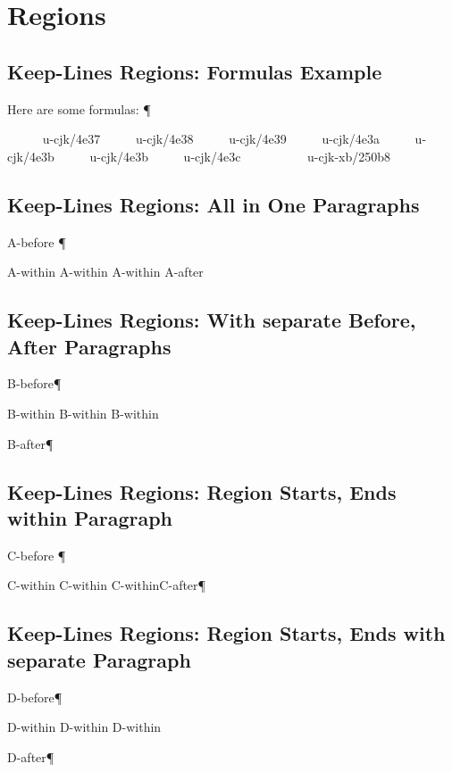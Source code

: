 

\chapter{Regions
}

\section{Keep-Lines Regions: Formulas Example
}


Here are some formulas:
¶\par\begingroup{}     
{\mktsFontfileSourcecodeproregular{}u-cjk/4e37}     
{\mktsFontfileSourcecodeproregular{}u-cjk/4e38}     
{\mktsFontfileSourcecodeproregular{}u-cjk/4e39}     
{\mktsFontfileSourcecodeproregular{}u-cjk/4e3a}     
{\mktsFontfileSourcecodeproregular{}u-cjk/4e3b}     
{\mktsFontfileSourcecodeproregular{}u-cjk/4e3b}     
{\mktsFontfileSourcecodeproregular{}u-cjk/4e3c}          
{\mktsFontfileSourcecodeproregular{}u-cjk-xb/250b8}     \endgroup{}
\section{Keep-Lines Regions: All in One Paragraphs
}


A-before
¶\par\begingroup\obeyalllines{}A-within
A-within
A-within
\endgroup{}A-after
\section{Keep-Lines Regions: With separate Before, After Paragraphs
}


B-before¶\par

\begingroup\obeyalllines{}B-within
B-within
B-within
\endgroup{}

B-after¶\par
\section{Keep-Lines Regions: Region Starts, Ends within Paragraph
}


C-before
¶\par\begingroup\obeyalllines{}C-within
C-within
C-within\endgroup{}C-after¶\par
\section{Keep-Lines Regions: Region Starts, Ends with separate Paragraph
}


D-before¶\par

\begingroup\obeyalllines{}D-within
D-within
D-within\endgroup{}

D-after¶\par


